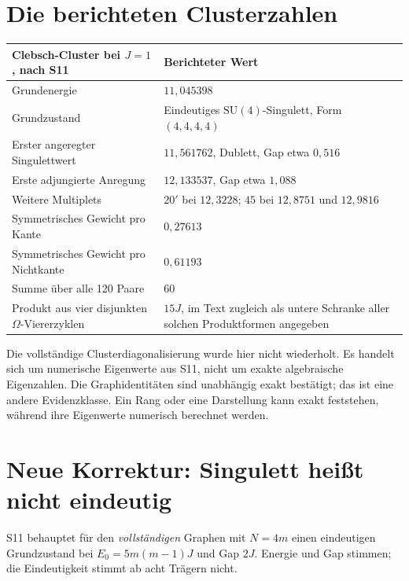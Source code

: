 \section{Die berichteten Clusterzahlen}
\par\noindent\begin{tabularx}{\linewidth}{L{74mm}Y}
\toprule
\textbf{Clebsch-Cluster bei $J=1$, nach S11}&\textbf{Berichteter Wert}\\\midrule
Grundenergie&$11{,}045398$\\
Grundzustand&Eindeutiges $\mathrm{SU}(4)$-Singulett, Form $(4,4,4,4)$\\
Erster angeregter Singulettwert&$11{,}561762$, Dublett, Gap etwa $0{,}516$\\
Erste adjungierte Anregung&$12{,}133537$, Gap etwa $1{,}088$\\
Weitere Multiplets&$20'$ bei $12{,}3228$; $45$ bei $12{,}8751$ und $12{,}9816$\\
Symmetrisches Gewicht pro Kante&$0{,}27613$\\
Symmetrisches Gewicht pro Nichtkante&$0{,}61193$\\
Summe über alle 120 Paare&$60$\\
Produkt aus vier disjunkten $\Omega$-Viererzyklen&$15J$, im Text zugleich als untere Schranke aller solchen Produktformen angegeben\\\bottomrule
\end{tabularx}\par
Die vollständige Clusterdiagonalisierung wurde hier nicht wiederholt. Es handelt sich um numerische Eigenwerte aus S11, nicht um exakte algebraische Eigenzahlen. Die Graphidentitäten sind unabhängig exakt bestätigt; das ist eine andere Evidenzklasse. Ein Rang oder eine Darstellung kann exakt feststehen, während ihre Eigenwerte numerisch berechnet werden.

\section{Neue Korrektur: Singulett heißt nicht eindeutig}
S11 behauptet für den \emph{vollständigen} Graphen mit $N=4m$ einen eindeutigen Grundzustand bei $E_0=5m(m-1)J$ und Gap $2J$. Energie und Gap stimmen; die Eindeutigkeit stimmt ab acht Trägern nicht.

